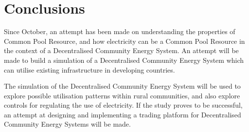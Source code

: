\chapter{Conclusions}
\label{Conclusions}

Since October, an attempt has been made on understanding the properties of Common Pool Resource, and how electricity can be a Common Pool Resource in the context of a Decentralised Community Energy System. An attempt will be made to build a simulation of a Decentralised Community Energy System which can utilise existing infrastructure in developing countries. 

The simulation of the Decentralised Community Energy System will be used to explore possible utilisation patterns within rural communities, and also explore controls for regulating the use of electricity. If the study proves to be successful, an attempt at designing and implementing a trading platform for Decentralised Community Energy Systems will be made. 